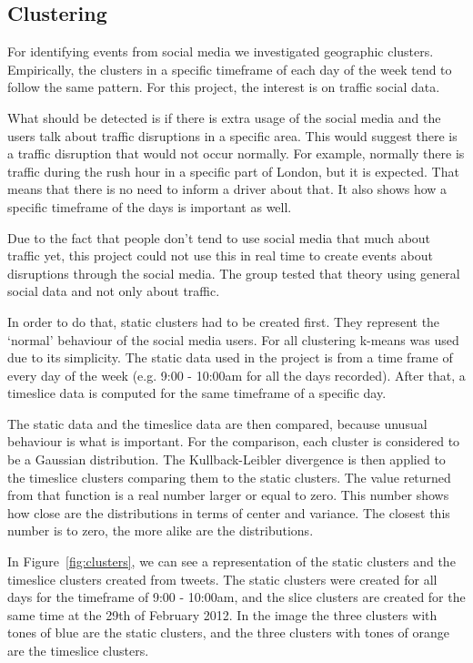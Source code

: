 \subsection{Clustering}

For identifying events from social media we investigated geographic clusters.
Empirically, the clusters in a specific timeframe of each day of
the week tend to follow the same pattern. For this project, the interest is on
traffic social data.

What should be detected is if there is extra usage of the social media and the users talk about
traffic disruptions in a specific area. This would suggest there is a traffic
disruption that would not occur normally. For example, normally there is traffic during
the rush hour in a specific part of London, but it is expected. That means that
there is no need to inform a driver about that. It also shows how a specific
timeframe of the days is important as well.

Due to the fact that people don't tend to use social media that much about
traffic yet, this project could not use this in real time to create events
about disruptions through the social media. The group
tested that theory using general social data and not only about traffic.

In order to do that, static clusters had to be created first.
They represent the `normal' behaviour of the social media users. For all clustering
k-means\cite{website:k-means} was used due to its simplicity. The static data used in the project is
from a time frame of every day of the week (e.g. 9:00 - 10:00am for all the
days recorded). After that, a timeslice data is computed for the same timeframe
of a specific day.

The static data and the timeslice data are then compared, because unusual
behaviour is what is important. For the comparison, each cluster is considered
to be a Gaussian distribution\cite{website:gaussian}. The Kullback-Leibler
divergence\cite{Kullback} is then applied to the timeslice clusters comparing
them to the static clusters. The value returned from that function is a real
number larger or equal to zero. This number shows how close are the
distributions in terms of center and variance. The closest this number is to
zero, the more alike are the distributions.

In Figure~\ref{fig:clusters}, we can see a representation of the static clusters and the
timeslice clusters created from tweets. The static clusters were created for
all days for the timeframe of 9:00 - 10:00am, and the slice clusters are
created for the same time at the 29th of February 2012. In the image the three
clusters with tones of blue are the static clusters, and the three clusters
with tones of orange are the timeslice clusters.

